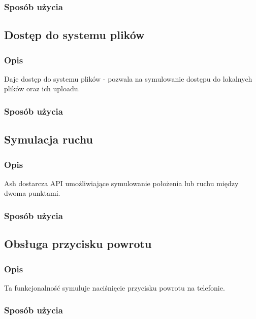 \documentclass[a4paper]{article}
\begin{document}
\subsubsection{Sposób użycia}

\subsection{Dostęp do systemu plików}

\subsubsection{Opis}
Daje dostęp do systemu plików - pozwala na symulowanie dostępu do lokalnych plików oraz ich uploadu.

\subsubsection{Sposób użycia}

\subsection{Symulacja ruchu}

\subsubsection{Opis}
Ash dostarcza API umożliwiające symulowanie położenia lub ruchu między dwoma punktami.

\subsubsection{Sposób użycia}

\subsection{Obsługa przycisku powrotu}

\subsubsection{Opis}
Ta funkcjonalność symuluje naciśnięcie przycisku powrotu na telefonie.

\subsubsection{Sposób użycia}
\end{document}
